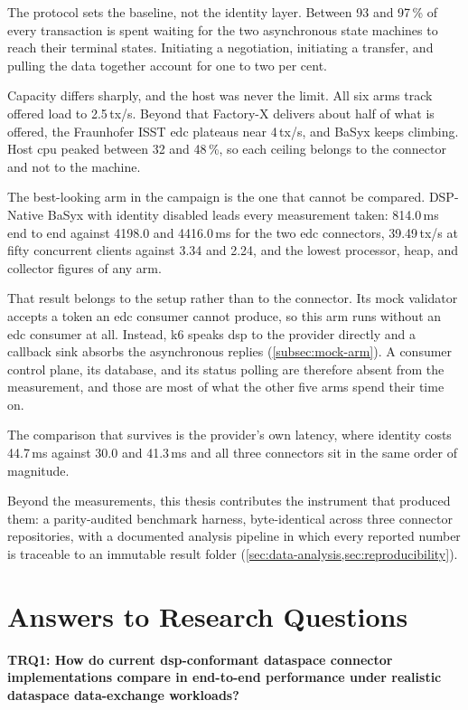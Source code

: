 \pagebreak

The protocol sets the baseline, not the identity layer. Between 93 and 97\,\% of every
transaction is spent waiting for the two asynchronous state machines to reach their
terminal states. Initiating a negotiation, initiating a transfer, and pulling the data
together account for one to two per cent.

Capacity differs sharply, and the host was never the limit. All six arms track offered
load to 2.5\,tx/s. Beyond that Factory-X delivers about half of what is offered, the
Fraunhofer ISST \gls{edc} plateaus near 4\,tx/s, and BaSyx keeps climbing. Host \gls{cpu}
peaked between 32 and 48\,\%, so each ceiling belongs to the connector and not to the
machine.

The best-looking arm in the campaign is the one that cannot be compared. DSP-Native BaSyx
with identity disabled leads every measurement taken: 814.0\,ms end to end against
4198.0 and 4416.0\,ms for the two \gls{edc} connectors, 39.49\,tx/s at fifty concurrent
clients against 3.34 and 2.24, and the lowest processor, heap, and collector figures of any arm.

That result belongs to the setup rather than to the connector. Its mock validator accepts a token an \gls{edc} consumer cannot produce, so this arm runs without an \gls{edc} consumer at all. Instead, k6 speaks \gls{dsp} to the provider directly and a callback sink absorbs the asynchronous replies (\cref{subsec:mock-arm}). A consumer control plane, its database,
and its status polling are therefore absent from the measurement, and those are most of what the other five arms spend their time on.

The comparison that survives is the provider's own latency, where identity costs 44.7\,ms against 30.0 and 41.3\,ms and all
three connectors sit in the same order of magnitude.

Beyond the measurements, this thesis contributes the instrument that produced them: a
parity-audited benchmark harness, byte-identical across three connector repositories, with
a documented analysis pipeline in which every reported number is traceable to an immutable
result folder (\cref{sec:data-analysis,sec:reproducibility}).


\section{Answers to Research Questions}\label{sec:answers-rq}

\textbf{TRQ1: How do current \gls{dsp}-conformant dataspace connector implementations
compare in end-to-end performance under realistic dataspace data-exchange workloads?}

